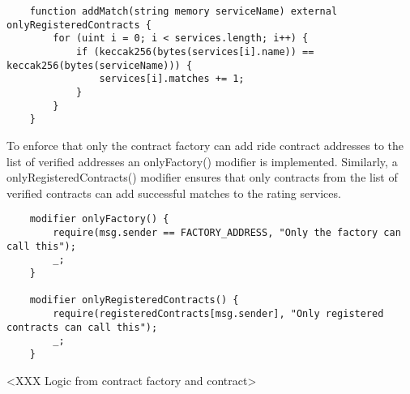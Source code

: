 \lstset{
  basicstyle=\footnotesize\ttfamily,
  breaklines=true,
  numbers=left,
  firstnumber=81
}
\begin{lstlisting}
    function addMatch(string memory serviceName) external onlyRegisteredContracts {
        for (uint i = 0; i < services.length; i++) {
            if (keccak256(bytes(services[i].name)) == keccak256(bytes(serviceName))) {
                services[i].matches += 1;
            }
        }
    }
\end{lstlisting}

To enforce that only the contract factory can add ride contract addresses to the list of verified addresses an onlyFactory() modifier is implemented. Similarly, a onlyRegisteredContracts() modifier ensures that only contracts from the list of verified contracts can add successful matches to the rating services.

\lstset{
  basicstyle=\footnotesize\ttfamily,
  breaklines=true,
  numbers=left,
  firstnumber=24
}
\begin{lstlisting}
    modifier onlyFactory() {
        require(msg.sender == FACTORY_ADDRESS, "Only the factory can call this");
        _;
    }

    modifier onlyRegisteredContracts() {
        require(registeredContracts[msg.sender], "Only registered contracts can call this");
        _;
    }
\end{lstlisting}


<XXX Logic from contract factory and contract>




